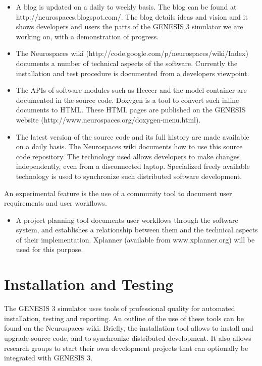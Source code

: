 \documentclass[12pt]{article}
\begin{document}
\begin{itemize}
\item A blog is updated on a daily to weekly basis.  The blog can be
  found at http://neurospaces.blogspot.com/.  The blog details ideas
  and vision and it shows developers and users the parts of the
  GENESIS 3 simulator we are working on, with a demonstration of
  progress.
\item The Neurospaces wiki
  (http://code.google.com/p/neurospaces/wiki/Index) documents a number
  of technical aspects of the software.  Currently the installation
  and test procedure is documented from a developers viewpoint.
\item The APIs of software modules such as Heccer and the model
  container are documented in the source code.  Doxygen is a tool to
  convert such inline documents to HTML.  These HTML pages are
  published on the GENESIS website
  (http://www.neurospaces.org/doxygen-menu.html).
\item The latest version of the source code and its full history are
  made available on a daily basis.  The Neurospaces wiki documents how
  to use this source code repository.  The technology used allows
  developers to make changes independently, even from a disconnected
  laptop.  Specialized freely available technology is used to
  synchronize such distributed software development.
\end{itemize}

An experimental feature is the use of a community tool to document
user requirements and user workflows.

\begin{itemize}
\item A project planning tool documents user workflows through the
  software system, and establishes a relationship between them and the
  technical aspects of their implementation.  Xplanner (available from
  www.xplanner.org) will be used for this purpose.
\end{itemize}


\section{Installation and Testing}

The GENESIS 3 simulator uses tools of professional quality for
automated installation, testing and reporting.  An outline of the use
of these tools can be found on the Neurospaces wiki.  Briefly, the
installation tool allows to install and upgrade source code, and to
synchronize distributed development.  It also allows research groups
to start their own development projects that can optionally be
integrated with GENESIS 3.
\end{document}
